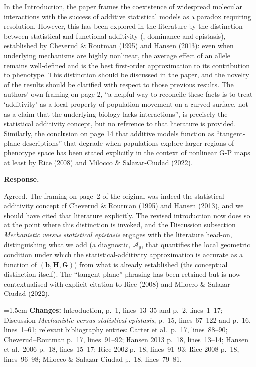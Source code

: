 \documentclass[11pt,a4paper]{article}
\newcommand{\response}{%
  \par\medskip\noindent\textbf{\color{ResponseColor}Response.}\quad\ignorespaces
}
\newcommand{\changesat}[1]{%
  \par\smallskip\noindent\hangindent=1.5em\hangafter=1
  \textbf{\color{ChangeColor}Changes:} \quad #1\par\medskip
}
\newcommand{\Ag}{\ensuremath{\mathcal{A}_{g}}\xspace}
\newcommand{\mat}[1]{\ensuremath{\mathbf{#1}}}
\newcommand{\vect}[1]{\ensuremath{\bm{#1}}}
\begin{document}
\begin{revquote}
In the Introduction, the paper frames the coexistence of widespread molecular interactions with the success of additive statistical models as a paradox requiring resolution. However, this has been explored in the literature by the distinction between statistical and functional additivity (, dominance and epistasis), established by Cheverud \& Routman (1995) and Hansen (2013): even when underlying mechanisms are highly nonlinear, the average effect of an allele remains well-defined and is the best first-order approximation to its contribution to phenotype. This distinction should be discussed in the paper, and the novelty of the results should be clarified with respect to those previous results. The authors' own framing on page 2, ``a helpful way to reconcile these facts is to treat `additivity' as a local property of population movement on a curved surface, not as a claim that the underlying biology lacks interactions'', is precisely the statistical additivity concept, but no reference to that literature is provided. Similarly, the conclusion on page 14 that additive models function as ``tangent-plane descriptions'' that degrade when populations explore larger regions of phenotype space has been stated explicitly in the context of nonlinear G-P maps at least by Rice (2008) and Milocco \& Salazar-Ciudad (2022).
\end{revquote}

\response
Agreed. The framing on page~2 of the original was indeed the statistical-additivity concept of Cheverud \& Routman (1995) and Hansen (2013), and we should have cited that literature explicitly. The revised introduction now does so at the point where this distinction is invoked, and the Discussion subsection \textit{Mechanistic versus statistical epistasis} engages with the literature head-on, distinguishing what we add (a diagnostic, $\Ag$, that quantifies the local geometric condition under which the statistical-additivity approximation is accurate as a function of $(\vect{b}, \mat{H}, \mat{G})$) from what is already established (the conceptual distinction itself). The ``tangent-plane'' phrasing has been retained but is now contextualised with explicit citation to Rice (2008) and Milocco \& Salazar-Ciudad (2022).

\changesat{Introduction, p.~1, lines~13--35 and p.~2, lines~1--17; Discussion \textit{Mechanistic versus statistical epistasis}, p.~15, lines~67--122 and p.~16, lines~1--61; relevant bibliography entries: Carter et al.\ p.~17, lines~88--90; Cheverud--Routman p.~17, lines~91--92; Hansen 2013 p.~18, lines~13--14; Hansen et al.\ 2006 p.~18, lines~15--17; Rice 2002 p.~18, lines~91--93; Rice 2008 p.~18, lines~96--98; Milocco \& Salazar-Ciudad p.~18, lines~79--81.}
\end{document}
